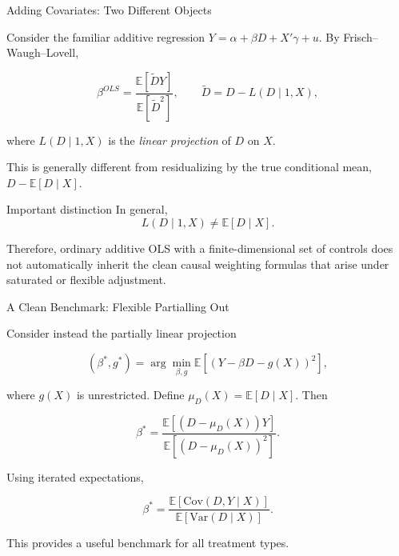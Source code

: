 \documentclass[aspectratio=169,11pt]{beamer}
\begin{document}
\begin{frame}{Adding Covariates: Two Different Objects}
\small

Consider the familiar additive regression
\(Y=\alpha+\beta D+X'\gamma+u\).
By Frisch--Waugh--Lovell,

\[
\boxed{
\beta^{OLS}
=
\frac{\mathbb{E}[\widetilde D Y]}
{\mathbb{E}[\widetilde D^2]},
\qquad
\widetilde D
=
D-L(D\mid 1,X),
}
\]

where \(L(D\mid 1,X)\) is the \emph{linear projection} of \(D\) on \(X\).

\medskip

This is generally different from residualizing by the true conditional mean,
\(D-\mathbb{E}[D\mid X]\).

\begin{alertblock}{Important distinction}
In general,
\[
L(D\mid 1,X)
\neq
\mathbb{E}[D\mid X].
\]

Therefore, ordinary additive OLS with a finite-dimensional set of
controls does not automatically inherit the clean causal weighting
formulas that arise under saturated or flexible adjustment.
\end{alertblock}

\end{frame}


\begin{frame}{A Clean Benchmark: Flexible Partialling Out}
\small

Consider instead the partially linear projection

\[
(\beta^*,g^*)
=
\arg\min_{\beta,g}
\mathbb{E}
\left[
\left(Y-\beta D-g(X)\right)^2
\right],
\]

where \(g(X)\) is unrestricted.
Define \(\mu_D(X)=\mathbb{E}[D\mid X]\). Then

\[
\boxed{
\beta^*
=
\frac{
\mathbb{E}
\left[
(D-\mu_D(X))Y
\right]
}{
\mathbb{E}
\left[
(D-\mu_D(X))^2
\right]
}.
}
\]

Using iterated expectations,

\[
\boxed{
\beta^*
=
\frac{
\mathbb{E}
\left[
\mathrm{Cov}(D,Y\mid X)
\right]
}{
\mathbb{E}
\left[
\mathrm{Var}(D\mid X)
\right]
}.
}
\]

This provides a useful benchmark for all treatment types.

\end{frame}


\end{document}

